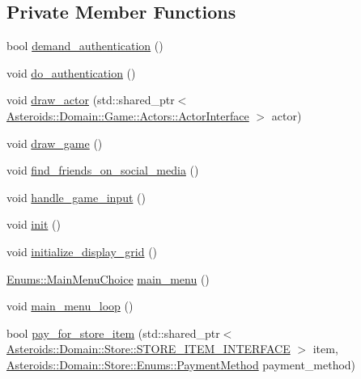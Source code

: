 \subsection*{Private Member Functions}
\begin{DoxyCompactItemize}
\item 
bool \hyperlink{classAsteroids_1_1UI_1_1ClientTextUI_1_1ClientTextUI_ac3cec81751843b8e8fa503af51b17546}{demand\+\_\+authentication} ()
\item 
void \hyperlink{classAsteroids_1_1UI_1_1ClientTextUI_1_1ClientTextUI_a96251b4d6623fda575f39b84677b0ed5}{do\+\_\+authentication} ()
\item 
void \hyperlink{classAsteroids_1_1UI_1_1ClientTextUI_1_1ClientTextUI_a6157c8167618db7195c35479096620ec}{draw\+\_\+actor} (std\+::shared\+\_\+ptr$<$ \hyperlink{classAsteroids_1_1Domain_1_1Game_1_1Actors_1_1ActorInterface}{Asteroids\+::\+Domain\+::\+Game\+::\+Actors\+::\+Actor\+Interface} $>$ actor)
\item 
void \hyperlink{classAsteroids_1_1UI_1_1ClientTextUI_1_1ClientTextUI_a68028ff6a5b6d38321496c83ff872158}{draw\+\_\+game} ()
\item 
void \hyperlink{classAsteroids_1_1UI_1_1ClientTextUI_1_1ClientTextUI_ac6ed983203b9d88a3a7d532eeceac524}{find\+\_\+friends\+\_\+on\+\_\+social\+\_\+media} ()
\item 
void \hyperlink{classAsteroids_1_1UI_1_1ClientTextUI_1_1ClientTextUI_aaea5f1fccb9aa46a331b15ad2274b319}{handle\+\_\+game\+\_\+input} ()
\item 
void \hyperlink{classAsteroids_1_1UI_1_1ClientTextUI_1_1ClientTextUI_af89b843cd3eecc9b5b54cf3067b5fab8}{init} ()
\item 
void \hyperlink{classAsteroids_1_1UI_1_1ClientTextUI_1_1ClientTextUI_a681a6bfc7d4438a4eb3cc146c9117125}{initialize\+\_\+display\+\_\+grid} ()
\item 
\hyperlink{namespaceAsteroids_1_1UI_1_1ClientTextUI_1_1Enums_a009625aa8c73d3ab757537ad32c367b6}{Enums\+::\+Main\+Menu\+Choice} \hyperlink{classAsteroids_1_1UI_1_1ClientTextUI_1_1ClientTextUI_a9d9c6942f7cf39ddb177df02fbe3e742}{main\+\_\+menu} ()
\item 
void \hyperlink{classAsteroids_1_1UI_1_1ClientTextUI_1_1ClientTextUI_a67521714973f97f76618f9598d34d3b8}{main\+\_\+menu\+\_\+loop} ()
\item 
bool \hyperlink{classAsteroids_1_1UI_1_1ClientTextUI_1_1ClientTextUI_a4613a9af03e06c960c467b0b6be44db9}{pay\+\_\+for\+\_\+store\+\_\+item} (std\+::shared\+\_\+ptr$<$ \hyperlink{classAsteroids_1_1Domain_1_1Store_1_1STORE__ITEM__INTERFACE}{Asteroids\+::\+Domain\+::\+Store\+::\+S\+T\+O\+R\+E\+\_\+\+I\+T\+E\+M\+\_\+\+I\+N\+T\+E\+R\+F\+A\+CE} $>$ item, \hyperlink{namespaceAsteroids_1_1Domain_1_1Store_1_1Enums_a0a0c269f6834cb8b1b6ed3bb02983564}{Asteroids\+::\+Domain\+::\+Store\+::\+Enums\+::\+Payment\+Method} payment\+\_\+method)

\end{DoxyCompactItemize}
